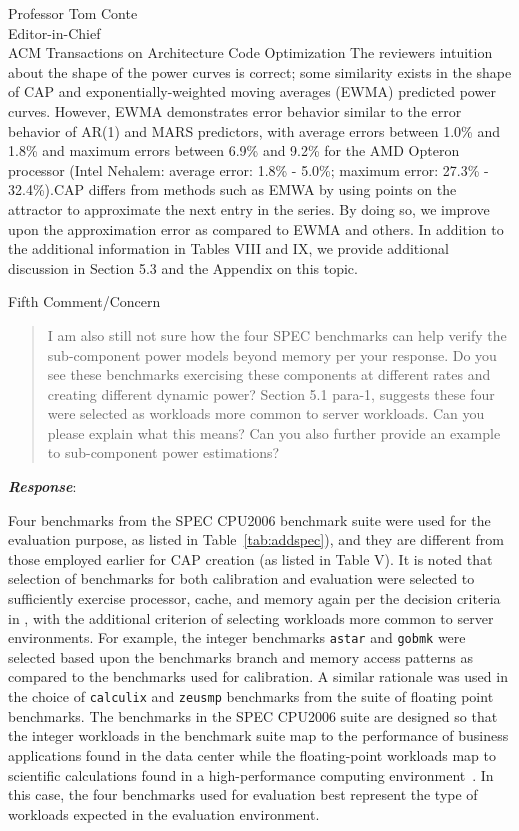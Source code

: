 \documentclass[10pt]{letter} %
\newenvironment{rviewcomment}
{~\\%
\begin{bfseries}}
{\end{bfseries}}
\newcommand{\rviewresponse}{\textbf{\textit{Response}}:}
\begin{document}
\begin{letter}{Professor Tom Conte \\
Editor-in-Chief \\
ACM Transactions on Architecture Code Optimization }
The reviewers intuition about the shape of the power curves is correct;
some similarity exists in the shape of CAP and exponentially-weighted
moving averages (EWMA) predicted power curves.  However, EWMA
demonstrates error behavior similar to the error behavior of AR(1) and
MARS predictors, with average errors between 1.0\% and 1.8\% and maximum
errors between 6.9\% and 9.2\% for the AMD Opteron processor (Intel
Nehalem: average error: 1.8\% - 5.0\%; maximum error: 27.3\% -
32.4\%).CAP differs from methods such as EMWA by using points on the
attractor to approximate the next entry in the series.  By doing so, we
improve upon the approximation error as compared to EWMA and others.  In
addition to the additional information in Tables VIII and IX, we provide
additional discussion in Section 5.3 and the Appendix on this topic.
\newpage
\begin{rviewcomment}
  Fifth Comment/Concern
\end{rviewcomment}
\begin{quote}
  \begin{itshape}
    I am also still not sure how the four SPEC benchmarks can help
    verify the sub-component power models beyond memory per your
    response. Do you see these benchmarks exercising these components at
    different rates and creating different dynamic power? Section 5.1
    para-1, suggests these four were selected as workloads more common
    to server workloads. Can you please explain what this means? Can you
    also further provide an example to sub-component power estimations?
  \end{itshape}
\end{quote}
\rviewresponse

Four benchmarks from the SPEC CPU2006 benchmark suite were used for the
evaluation purpose, as listed in Table~\ref{tab:addspec}), and they are
different from those employed earlier for CAP creation (as listed in
Table V). It is noted that selection of benchmarks for both calibration
and evaluation were selected to sufficiently exercise processor, cache,
and memory again per the decision criteria in \cite{Phansalkar2007},
with the additional criterion of selecting workloads more common to
server environments. For example, the integer benchmarks
\texttt{astar} and \texttt{gobmk} were selected based upon the
benchmarks branch and memory
access patterns as compared to the benchmarks used for
calibration.  A similar rationale was used in the choice of
\texttt{calculix} and \texttt{zeusmp} benchmarks
from the suite of floating point benchmarks.  The benchmarks in the SPEC
CPU2006 suite are designed so that the integer workloads in the
benchmark suite map to the performance of business applications found in
the data center while the floating-point workloads map to scientific
calculations found in a high-performance computing
environment~\cite{Cisco2010}.   In this case, the four benchmarks used
for evaluation best represent the type of workloads expected in the
evaluation environment.


\end{letter}
\end{document}
